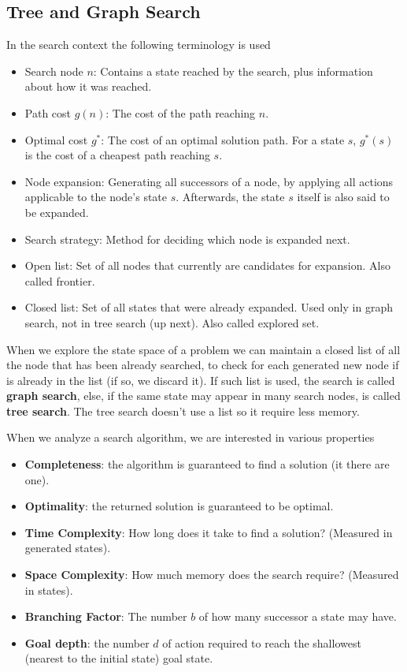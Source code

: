 \documentclass[10pt, letterpaper]{report}
\begin{document}
\subsection{Tree and Graph Search}
In the search context the following terminology is used
\begin{itemize}
    \item Search node $n$: Contains a state reached by the search, plus information about how it was reached.
    \item Path cost $g(n)$: The cost of the path reaching $n$.
    \item Optimal cost $g^*$: The cost of an optimal solution path. For a state $s$, $g^*(s)$ is the cost of a cheapest path reaching $s$.
    \item Node expansion: Generating all successors of a node, by applying all actions applicable to the node's state $s$. Afterwards, the state $s$ itself is also said to be expanded.
    \item Search strategy: Method for deciding which node is expanded next.
    \item Open list: Set of all nodes that currently are candidates for expansion. Also called frontier.
    \item Closed list: Set of all states that were already expanded. Used only in graph search, not in tree search (up next). Also called explored set.
\end{itemize}
When we explore the state space of a problem we can maintain a closed list of all the node that has been already searched, to check for each generated new node if is already in the list (if so, we discard it). If such list is used, the search is called \textbf{graph search}, else, if the same state may appear in many search nodes, is called \textbf{tree search}. The tree search doesn't use a list so it require less memory.\bigskip

\noindent When we analyze a search algorithm, we are interested in various properties\begin{itemize}
    \item \textbf{Completeness}: the algorithm is guaranteed to find a solution (it there are one).
    \item \textbf{Optimality}: the returned solution is guaranteed to be optimal. 
    \item \textbf{Time Complexity}: How long does it take to find a solution? (Measured
in generated states).
    \item \textbf{Space Complexity}: How much memory does the search require?
(Measured in states).
    \item \textbf{Branching Factor}: The number $b$ of how many successor a state may have.
    \item \textbf{Goal depth}: the number $d$ of action required to reach the shallowest (nearest to the initial state) goal state.
\end{itemize}
\end{document}
